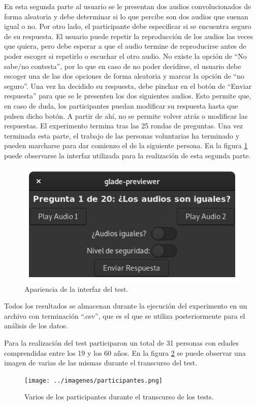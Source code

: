 \documentclass[11pt,a4paper,twoside]{book}
\begin{document}
                En esta segunda parte al usuario se le presentan dos audios convolucionados de forma aleatoria y debe determinar si lo que percibe son dos audios que suenan igual o no. Por otro lado, el participante debe especificar si se encuentra seguro de su respuesta. El usuario puede repetir la reproducción de los audios las veces que quiera, pero debe esperar a que el audio termine de reproducirse antes de poder escoger si repetirlo o escuchar el otro audio. No existe la opción de ``No sabe/no contesta'', por lo que en caso de no poder decidirse, el usuario debe escoger una de las dos opciones de forma aleatoria y marcar la opción de ``no seguro''. Una vez ha decidido su respuesta, debe pinchar en el botón de ``Enviar respuesta'' para que se le presenten los dos siguientes audios. Esto permite que, en caso de duda, los participantes puedan modificar su respuesta hasta que pulsen dicho botón. A partir de ahí, no se permite volver atrás o modificar las respuestas. El experimento termina tras las 25 rondas de preguntas. Una vez terminada esta parte, el trabajo de las personas voluntarias ha terminado y pueden marcharse para dar comienzo el de la siguiente persona. En la figura \ref{fig:interfazTestFin} puede observarse la interfaz utilizada para la realización de esta segunda parte.
                
                \begin{figure}
                    \includegraphics[scale=0.6]{../imagenes/interFin.png}
			        \centering
			        \caption{Apariencia de la interfaz del test.}
			        \label{fig:interfazTestFin}
                \end{figure}
                
                Todos los resultados se almacenan durante la ejecución del experimento en un archivo con terminación ``.csv'', que es el que se utiliza posteriormente para el análisis de los datos.
                
                Para la realización del test participaron un total de 31 personas con edades comprendidas entre los 19 y los 60 años. En la figura \ref{fig:participantes} se puede observar una imagen de varias de las mismas durante el transcurso del test.
                
                \begin{figure}
                    \texttt{[image: ../imagenes/participantes.png]}
			        \centering
			        \caption{Varios de los participantes durante el transcurso de los tests.}
			        \label{fig:participantes}
                \end{figure}
            
            
\end{document}
